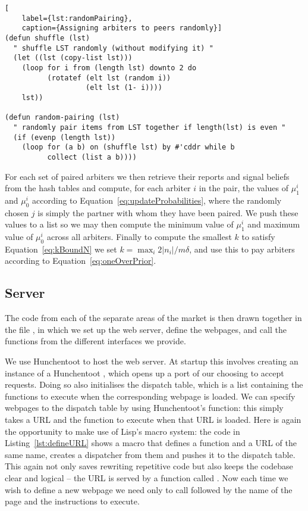 \begin{lstlisting}[
	label={lst:randomPairing},
	caption={Assigning arbiters to peers randomly}]
(defun shuffle (lst)
  " shuffle LST randomly (without modifying it) "
  (let ((lst (copy-list lst)))
    (loop for i from (length lst) downto 2 do
          (rotatef (elt lst (random i))
                   (elt lst (1- i))))
    lst))

(defun random-pairing (lst)
  " randomly pair items from LST together if length(lst) is even "
  (if (evenp (length lst))
    (loop for (a b) on (shuffle lst) by #'cddr while b
          collect (list a b))))
\end{lstlisting}

For each set of paired arbiters we then retrieve their reports and signal
beliefs from the hash tables and compute, for each arbiter $i$ in the pair, the
values of $\mu_1^i$ and $\mu_0^i$ according to
Equation~\ref{eq:updateProbabilities}, where the randomly chosen $j$ is simply
the partner with whom they have been paired. We push these values to a list so
we may then compute the minimum value of $\mu_1^i$ and maximum value of
$\mu_0^i$ across all arbiters. Finally to compute the smallest $k$ to satisfy
Equation~\ref{eq:kBoundN} we set $k = \max_i 2|n_i|/m\delta$, and use this to
pay arbiters according to Equation~\ref{eq:oneOverPrior}.

\subsection{Server}

\label{sec:server}

The code from each of the separate areas of the market is then drawn together
in the file , in which we set up the web server, define the
webpages, and call the functions from the different interfaces we provide.

We use Hunchentoot to host the web server. At startup this involves creating an
instance of a Hunchentoot , which opens up a port of our
choosing to accept requests. Doing so also initialises the dispatch table,
which is a list containing the functions to execute when the corresponding
webpage is loaded. We can specify webpages to the dispatch table by using
Hunchentoot's  function: this simply takes a URL
and the function to execute when that URL is loaded. Here is again the
opportunity to make use of Lisp's macro system: the code in
Listing~\ref{lst:defineURL} shows a macro that defines a function and a URL of
the same name, creates a dispatcher from them and pushes it to the dispatch
table. This again not only saves rewriting repetitive code but also keeps the
codebase clear and logical -- the URL  is served by a function
called . Now each time we wish to define a new webpage we need only
to call  followed by the name of the page and the
instructions to execute.

